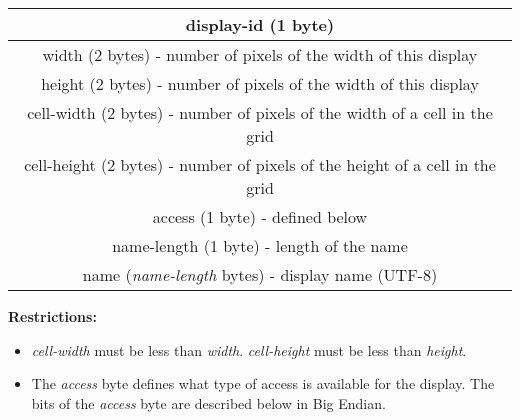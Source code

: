 \documentclass{article}
\begin{document}
    \begin{center}
        \begin{tabular}{|c|}
            \hline
            display-id (1 byte)                                                          \\
            \hline
            width (2 bytes) - number of pixels of the width of this display              \\
            \hline
            height (2 bytes) - number of pixels of the width of this display             \\
            \hline
            cell-width (2 bytes) - number of pixels of the width of a cell in the grid   \\
            \hline
            cell-height (2 bytes) - number of pixels of the height of a cell in the grid \\
            \hline
            access (1 byte) - defined below                                              \\
            \hline
            name-length (1 byte) -  length of the name                                     \\
            \hline
            name (\emph{name-length} bytes) - display name (UTF-8)                       \\
            \hline
        \end{tabular}
    \end{center}

    \textbf{Restrictions:}

    \begin{itemize}
        \item \emph{cell-width} must be less than \emph{width}. \emph{cell-height} must be less than \emph{height}.\\ %
        \item The \emph{access} byte defines what type of access is available for the display. The bits of the \emph{access} byte are described below in Big Endian.
    \end{itemize}
\end{document}
